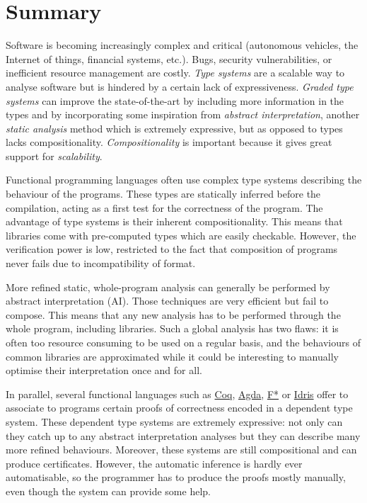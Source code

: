 \documentclass{article}[11pt]
\begin{document}
\vspace{2cm}



\newpage


\section{Summary}

Software is becoming increasingly complex and critical (autonomous vehicles, the Internet of things, financial systems, etc.). Bugs, security vulnerabilities, or inefficient resource management are costly. {\em Type systems} are a scalable way to analyse software but is hindered by a certain lack of expressiveness. {\em Graded type systems} can improve the state-of-the-art by including more information in the types and by incorporating some inspiration from {\em abstract interpretation}, another {\em static analysis} method which is extremely expressive, but as opposed to types lacks compositionality. {\em Compositionality} is important because it gives great support for {\em scalability}.

Functional programming languages often use complex type systems describing the behaviour of the programs. These types are statically inferred before the compilation, acting as a first test for the correctness of the program. The advantage of type systems is their inherent compositionality. This means that libraries come with pre-computed types which are easily checkable. However, the verification power is low, restricted to the fact that composition of programs never fails due to incompatibility of format.

More refined static, whole-program analysis can generally be performed by abstract interpretation (AI). Those techniques are very efficient but fail to compose. This means that any new analysis has to be performed through the whole program, including libraries. Such a global analysis has two flaws: it is often too resource consuming to be used on a regular basis, and the behaviours of common libraries are approximated while it could be interesting to manually optimise their interpretation once and for all.

In parallel, several functional languages such as \href{https://coq.inria.fr/}{Coq}, \href{http://wiki.portal.chalmers.se/agda/pmwiki.php}{Agda}, \href{https://www.fstar-lang.org/}{F*} or \href{http://www.idris-lang.org/}{Idris} offer to associate to programs certain proofs of correctness encoded in a dependent type system. These dependent type systems are extremely expressive: not only can they catch up to any abstract interpretation analyses but they can describe many more refined behaviours. Moreover, these systems are still compositional and can produce certificates. However, the automatic inference is hardly ever automatisable, so the programmer has to produce the proofs mostly manually, even though the system can provide some help.
\end{document}
